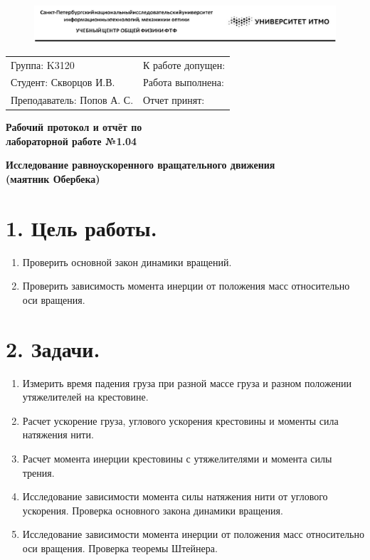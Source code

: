 \documentclass[14pt]{extreport}
\begin{document}
\begin{figure}[]
		\includegraphics[scale=0.66]{itmo_image.png}
		\label{pic1}
\end{figure}
\begin{flushleft}
\begin{tabular}{ p{9cm}p{8cm} }
 Группа: K3120 & К работе допущен: \\ 
 Студент: Скворцов И.В. & Работа выполнена: \\  
 Преподаватель: Попов А. С. & Отчет принят: \\    
\end{tabular}
\end{flushleft}

\begin{center}
\Large\textbf{Рабочий протокол и отчёт по\\лабораторной работе №1.04}

\large\textbf{Исследование равноускоренного вращательного движения \\ (маятник Обербека)}
\end{center}

\section*{1. Цель работы.}

\begin{enumerate}
    \item Проверить основной закон динамики вращений.
    \item Проверить зависимость момента инерции от положения масс относительно оси вращения.
\end{enumerate}

\section*{2. Задачи.}
\begin{enumerate}
    \item Измерить время падения груза при разной массе груза и разном положении утяжелителей на крестовине.
    \item Расчет ускорение груза, углового ускорения крестовины и моменты сила натяжения нити. 
    \item Расчет момента инерции крестовины с утяжелителями и момента силы трения. 
    \item Исследование зависимости момента силы натяжения нити от углового ускорения. Проверка основного закона динамики вращения.
    \item Исследование зависимости момента инерции от положения масс относительно оси вращения. Проверка теоремы Штейнера. 
\end{enumerate}
\end{document}
